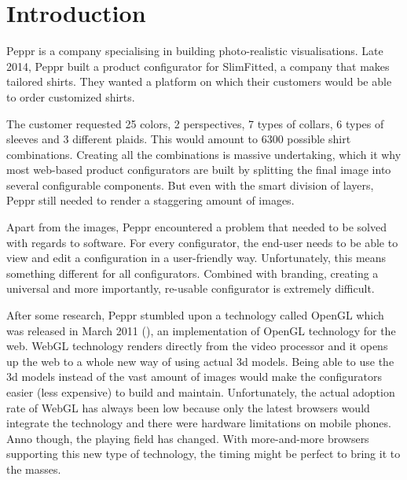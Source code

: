 \newpage
\chapter{Introduction}

Peppr is a company specialising in building photo-realistic visualisations. Late 2014, Peppr built a product configurator for SlimFitted, a company that makes tailored shirts. They wanted a platform on which their customers would be able to order customized shirts.

The customer requested 25 colors, 2 perspectives, 7 types of collars, 6 types of sleeves and 3 different plaids. This would amount to 6300 possible shirt combinations. Creating all the combinations is massive undertaking, which it why most web-based product configurators are built by splitting the final image into several configurable components. But even with the smart division of layers, Peppr still needed to render a staggering amount of images.

Apart from the images, Peppr encountered a problem that needed to be solved with regards to software. For every configurator, the end-user needs to be able to view and edit a configuration in a user-friendly way. Unfortunately, this means something different for all configurators. Combined with branding, creating a universal and more importantly, re-usable configurator is extremely difficult.

After some research, Peppr stumbled upon a technology called OpenGL which was released in March 2011 (\cite{OpenGL Website}), an implementation of OpenGL technology for the web. WebGL technology renders directly from the video processor and it opens up the web to a whole new way of using actual 3d models. Being able to use the 3d models instead of the vast amount of images would make the configurators easier (less expensive) to build and maintain. Unfortunately, the actual adoption rate of WebGL has always been low because only the latest browsers would integrate the technology and there were hardware limitations on mobile phones. Anno though, the playing field has changed. With more-and-more browsers supporting this new type of technology, the timing might be perfect to bring it to the masses.

